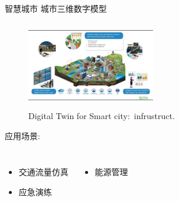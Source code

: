 \begin{frame}{智慧城市}
	城市三维数字模型
\begin{figure}[h!]
\centering
     \includegraphics[height=1.5in, width=2.2in, viewport=0 0 1280 720,clip]{Figures/Digital-Twin_Smart-city-infrustruct.jpg}
\caption{\tiny \textrm{Digital Twin for Smart city:~infrustruct.}}%
\label{Fig:Digital-Twin_Smart-city-infrustruct}
\end{figure}
应用场景:
  \begin{columns}
      \begin{itemize}
        \item 交通流量仿真
        \item 应急演练
      \end{itemize}

   \begin{itemize}
        \item 能源管理
      \end{itemize}
  \end{columns}
\end{frame}

%

